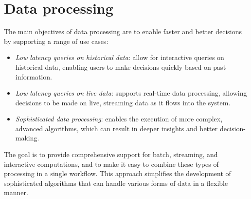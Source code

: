 \section{Data processing}

The main objectives of data processing are to enable faster and better decisions by supporting a range of use cases:
\begin{itemize}
    \item \textit{Low latency queries on historical data}: allow for interactive queries on historical data, enabling users to make decisions quickly based on past information.
    \item \textit{Low latency queries on live data}: supports real-time data processing, allowing decisions to be made on live, streaming data as it flows into the system.
    \item \textit{Sophisticated data processing}: enables the execution of more complex, advanced algorithms, which can result in deeper insights and better decision-making.
\end{itemize}
\noindent The goal is to provide comprehensive support for batch, streaming, and interactive computations, and to make it easy to combine these types of processing in a single workflow. 
This approach simplifies the development of sophisticated algorithms that can handle various forms of data in a flexible manner.

